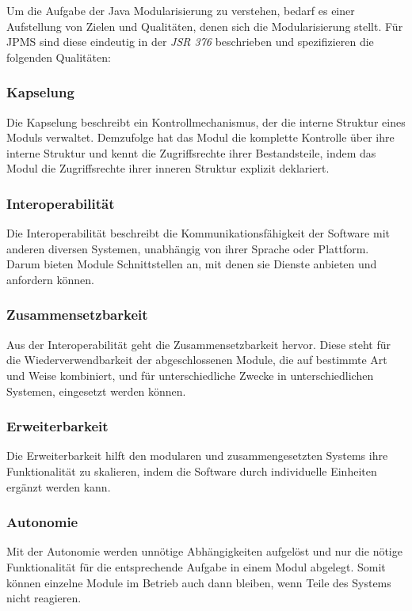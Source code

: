     Um die Aufgabe der Java Modularisierung zu verstehen, bedarf es einer Aufstellung von Zielen und Qualitäten, denen sich die Modularisierung stellt. Für JPMS sind diese eindeutig in der \textit{JSR 376} \cite{jmsOracle,java9modRevealed} beschrieben und spezifizieren die folgenden Qualitäten:

    \subsubsection{Kapselung}
      Die Kapselung beschreibt ein Kontrollmechanismus, der die interne Struktur eines Moduls verwaltet. Demzufolge hat das Modul die komplette Kontrolle über ihre interne Struktur und kennt die Zugriffsrechte ihrer Bestandsteile, indem das Modul die Zugriffsrechte ihrer inneren Struktur explizit deklariert.

    \subsubsection{Interoperabilität}
      Die Interoperabilität beschreibt die Kommunikationsfähigkeit der Software mit anderen diversen Systemen, unabhängig von ihrer Sprache oder Plattform. Darum bieten Module Schnittstellen an, mit denen sie Dienste anbieten und anfordern können.

    \subsubsection{Zusammensetzbarkeit}
      Aus der Interoperabilität geht die Zusammensetzbarkeit hervor. Diese steht für die Wiederverwendbarkeit der abgeschlossenen Module, die auf bestimmte Art und Weise kombiniert, und für unterschiedliche Zwecke in unterschiedlichen Systemen, eingesetzt werden können.

    \subsubsection{Erweiterbarkeit}
     Die Erweiterbarkeit hilft den modularen und zusammengesetzten Systems ihre Funktionalität zu skalieren, indem die Software durch individuelle Einheiten ergänzt werden kann. 

    \subsubsection{Autonomie}
      Mit der Autonomie werden unnötige Abhängigkeiten aufgelöst und nur die nötige Funktionalität für die entsprechende Aufgabe in einem Modul abgelegt. Somit können einzelne Module im Betrieb auch dann bleiben, wenn Teile des Systems nicht reagieren.

